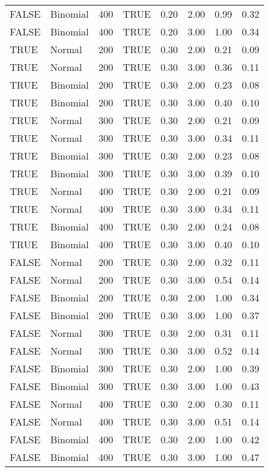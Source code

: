 \begin{table}[ht]
\begin{tabular}{llrlrrrr}
  FALSE & Binomial & 400 & TRUE & 0.20 & 2.00 & 0.99 & 0.32 \\ 
  FALSE & Binomial & 400 & TRUE & 0.20 & 3.00 & 1.00 & 0.34 \\ 
  TRUE & Normal & 200 & TRUE & 0.30 & 2.00 & 0.21 & 0.09 \\ 
  TRUE & Normal & 200 & TRUE & 0.30 & 3.00 & 0.36 & 0.11 \\ 
  TRUE & Binomial & 200 & TRUE & 0.30 & 2.00 & 0.23 & 0.08 \\ 
  TRUE & Binomial & 200 & TRUE & 0.30 & 3.00 & 0.40 & 0.10 \\ 
  TRUE & Normal & 300 & TRUE & 0.30 & 2.00 & 0.21 & 0.09 \\ 
  TRUE & Normal & 300 & TRUE & 0.30 & 3.00 & 0.34 & 0.11 \\ 
  TRUE & Binomial & 300 & TRUE & 0.30 & 2.00 & 0.23 & 0.08 \\ 
  TRUE & Binomial & 300 & TRUE & 0.30 & 3.00 & 0.39 & 0.10 \\ 
  TRUE & Normal & 400 & TRUE & 0.30 & 2.00 & 0.21 & 0.09 \\ 
  TRUE & Normal & 400 & TRUE & 0.30 & 3.00 & 0.34 & 0.11 \\ 
  TRUE & Binomial & 400 & TRUE & 0.30 & 2.00 & 0.24 & 0.08 \\ 
  TRUE & Binomial & 400 & TRUE & 0.30 & 3.00 & 0.40 & 0.10 \\ 
  FALSE & Normal & 200 & TRUE & 0.30 & 2.00 & 0.32 & 0.11 \\ 
  FALSE & Normal & 200 & TRUE & 0.30 & 3.00 & 0.54 & 0.14 \\ 
  FALSE & Binomial & 200 & TRUE & 0.30 & 2.00 & 1.00 & 0.34 \\ 
  FALSE & Binomial & 200 & TRUE & 0.30 & 3.00 & 1.00 & 0.37 \\ 
  FALSE & Normal & 300 & TRUE & 0.30 & 2.00 & 0.31 & 0.11 \\ 
  FALSE & Normal & 300 & TRUE & 0.30 & 3.00 & 0.52 & 0.14 \\ 
  FALSE & Binomial & 300 & TRUE & 0.30 & 2.00 & 1.00 & 0.39 \\ 
  FALSE & Binomial & 300 & TRUE & 0.30 & 3.00 & 1.00 & 0.43 \\ 
  FALSE & Normal & 400 & TRUE & 0.30 & 2.00 & 0.30 & 0.11 \\ 
  FALSE & Normal & 400 & TRUE & 0.30 & 3.00 & 0.51 & 0.14 \\ 
  FALSE & Binomial & 400 & TRUE & 0.30 & 2.00 & 1.00 & 0.42 \\ 
  FALSE & Binomial & 400 & TRUE & 0.30 & 3.00 & 1.00 & 0.47 \\ 

\end{tabular}
\end{table}
